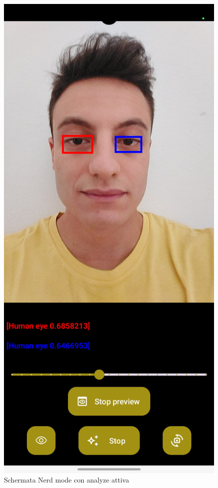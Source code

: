 \documentclass[11pt]{article}
\begin{document}
\begin{figure}[h]
\caption{Schermata Nerd mode con analyze attiva }
\centering
\includegraphics[scale=0.17]{img/CameraApp_Screen_nerd.jpg}
\end{figure}
\end{document}
